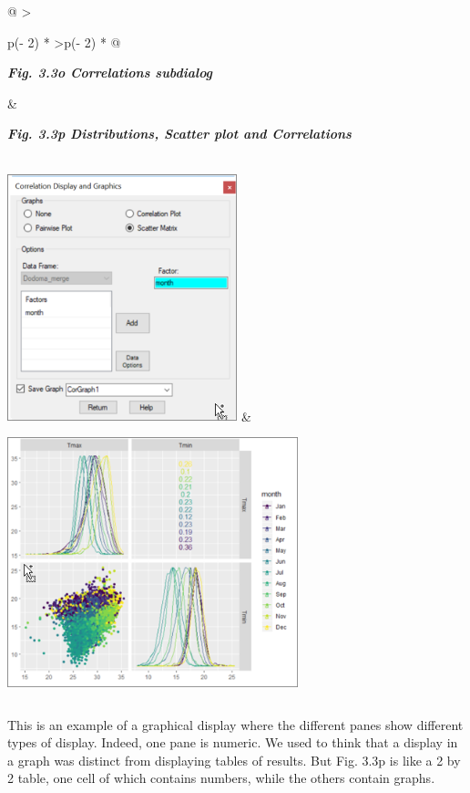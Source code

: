 \documentclass[
  letterpaper,
  DIV=11,
  numbers=noendperiod]{scrreprt}
\begin{document}
\begin{longtable}[]{@{}
  >{\raggedright\arraybackslash}p{(\columnwidth - 2\tabcolsep) * }
  >{\centering\arraybackslash}p{(\columnwidth - 2\tabcolsep) * }@{}}
\toprule\noalign{}
\begin{minipage}[b]{\linewidth}\raggedright
\textbf{\emph{Fig. 3.3o Correlations subdialog}}
\end{minipage} & \begin{minipage}[b]{\linewidth}\centering
\textbf{\emph{Fig. 3.3p Distributions, Scatter plot and Correlations}}
\end{minipage} \\
\midrule\noalign{}
\endhead
\bottomrule\noalign{}
\endlastfoot
\includegraphics[width=2.62941in,height=2.82749in]{figures/Fig3.3o.png}
&
\includegraphics[width=3.32619in,height=3.1183in]{figures/Fig3.3p.png} \\
\end{longtable}

This is an example of a graphical display where the different panes show
different types of display. Indeed, one pane is numeric. We used to
think that a display in a graph was distinct from displaying tables of
results. But Fig. 3.3p is like a 2 by 2 table, one cell of which
contains numbers, while the others contain graphs.
\end{document}
